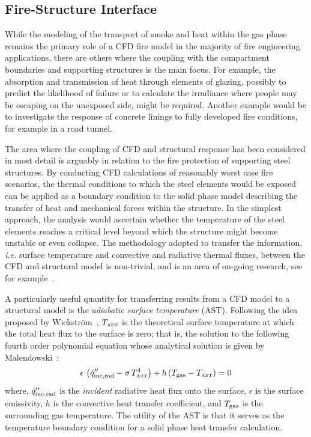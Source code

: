 \documentclass[graybox]{svmult}
\begin{document}
\subsection{Fire-Structure Interface}

While the modeling of the transport of smoke and heat within the gas phase remains the primary role of a CFD fire model in the majority of fire engineering applications, there are others where the coupling with the compartment boundaries and supporting structures is the main focus. For example, the absorption and transmission of heat through elements of glazing, possibly to predict the likelihood of failure or to calculate the irradiance where people may be escaping on the unexposed side, might be required. Another example would be to investigate the response of concrete linings to fully developed fire conditions, for example in a road tunnel.

The area where the coupling of CFD and structural response has been considered in most detail is arguably in relation to the fire protection of supporting steel structures. By conducting CFD calculations of reasonably worst case fire scenarios, the thermal conditions to which the steel elements would be exposed can be applied as a boundary condition to the solid phase model describing the transfer of heat and mechanical forces within the structure. In the simplest approach, the analysis would ascertain whether the temperature of the steel elements reaches a critical level beyond which the structure might become unstable or even collapse. The methodology adopted to transfer the information, {\em i.e.} surface temperature and convective and radiative thermal fluxes, between the CFD and structural model is non-trivial, and is an area of on-going research, see for example~\cite{Welch}.

A particularly useful quantity for transferring results from a CFD model to a structural model is the {\em adiabatic surface temperature} (AST). Following the idea proposed by Wickstr\"{o}m~\cite{Wickstrom:Interflam2007}, $T_{\hbox{\tiny AST}}$ is the theoretical surface temperature at which the total heat flux to the surface is zero; that is, the solution to the following fourth order polynomial equation whose analytical solution is given by Malendowski~\cite{Malendowski:FT}:
\begin{equation}
   \epsilon \, \left( \dot{q}_{\rm inc,rad}'' - \sigma \, T_{\hbox{\tiny AST}}^4 \right) + h \, (T_{\rm gas} - T_{\hbox{\tiny AST}}) = 0
\end{equation}
where, $\dot{q}_{\rm inc,rad}''$ is the {\em incident} radiative heat flux onto the surface, $\epsilon$ is the surface emissivity, $h$ is the convective heat transfer coefficient, and $T_{\rm gas}$ is the surrounding gas temperature. The utility of the AST is that it serves as the temperature boundary condition for a solid phase heat transfer calculation. 
\end{document}
